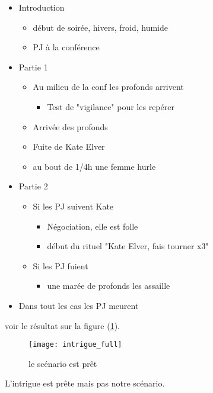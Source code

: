 \documentclass[a4paper,12pt]{article}
\begin{document}
\begin{itemize}
    \item Introduction
    \begin{itemize}
        \item début de soirée, hivers, froid, humide
        \item PJ à la conférence
    \end{itemize}
    \item Partie 1
    \begin{itemize}
        \item Au milieu de la conf les profonds arrivent
        \begin{itemize}
            \item Test de "vigilance" pour les repérer
        \end{itemize}
        \item Arrivée des profonds
        \item Fuite de Kate Elver
        \item au bout de 1/4h une femme hurle
    \end{itemize}
    \item Partie 2
    \begin{itemize}
        \item Si les PJ suivent Kate
        \begin{itemize}
            \item Négociation, elle est folle
            \item début du rituel "Kate Elver, fais tourner x3"
        \end{itemize}
        \item Si les PJ fuient
        \begin{itemize}
            \item une marée de profonds les assaille
        \end{itemize}
    \end{itemize}
    \item Dans tout les cas les PJ meurent
\end{itemize}
voir le résultat sur la figure (\ref{intrigue_full}).  
\begin{figure}[h!]
    \texttt{[image: intrigue\_full]}
    \caption{le scénario est prêt}
    \label{intrigue_full}
\end{figure}    
L'intrigue est prête mais pas notre scénario.
\end{document}
